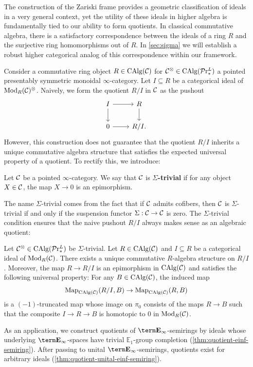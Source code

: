 \documentclass[10pt,a4paper,oneside]{article}
\begin{document}
The construction of the Zariski frame provides a geometric classification of ideals in a very general context, yet the utility of these ideals in higher algebra is fundamentally tied to our ability to form quotients. In classical commutative algebra, there is a satisfactory correspondence between the ideals of a ring $R$ and the surjective ring homomorphisms out of $R$. In \cref{sec:sigma} we will establish a robust higher categorical analog of this correspondence within our framework.

Consider a commutative ring object $R \in \operatorname{CAlg}(\mathcal{C})$ for $\mathcal{C}^\otimes\in\operatorname{CAlg}(\mathcal{P}\mathrm{r}^L_*)$ a pointed presentably symmetric monoidal $\infty$-category. Let $I\subseteq R$ be a categorical ideal of $\operatorname{Mod}_{R}(\mathcal{C})^\otimes$. Naively, we form the quotient $R/I$ in $\mathcal{C}$ as the pushout
\[
\begin{tikzcd}
I \arrow[d] \arrow[r] & R \arrow[d] \\
0 \arrow[r]           & R/I.
\end{tikzcd}
\]
However, this construction does not guarantee that the quotient $R/I$ inherits a unique commutative algebra structure that satisfies the expected universal property of a quotient. To rectify this, we introduce:
\begin{de}
Let $\mathcal{C}$ be a pointed $\infty$-category. We say that $\mathcal{C}$ is \textbf{$\Sigma$-trivial} if for any object $X\in\mathcal{C}$, the map $X\to0$ is an epimorphism.
\end{de}
The name $\Sigma$-trivial comes from the fact that if $\mathcal{C}$ admits cofibers, then $\mathcal{C}$ is $\Sigma$-trivial if and only if the suspension functor $\Sigma:\mathcal{C}\to \mathcal{C}$ is zero. The $\Sigma$-trivial condition ensures that the naive pushout $R/I$ always makes sense as an algebraic quotient:
\begin{thm}\label{thm:intro-quotidl}
Let $\mathcal{C}^\otimes\in\operatorname{CAlg}(\mathcal{P}\mathrm{r}^L_*)$ be $\Sigma$-trivial. Let $R\in\operatorname{CAlg}(\mathcal{C})$ and $I\subseteq R$ be a categorical ideal of $\operatorname{Mod}_{R}(\mathcal{C})$. There exists a unique commutative $R$-algebra structure on $R/I$. Moreover, the map $R\to R/I$ is an epimorphism in $\operatorname{CAlg}(\mathcal{C})$ and satisfies the following universal property: For any $B\in \operatorname{CAlg}(\mathcal{C})$, the induced map $$\operatorname{Map}_{\operatorname{CAlg}(\mathcal{C})}(R/I,B)\to \operatorname{Map}_{\operatorname{CAlg}(\mathcal{C})}(R,B)$$ is a $(-1)$-truncated map whose image on $\pi_0$ consists of the maps $R\to B$ such that the composite $I\to R\to B$ is homotopic to $0$ in $\operatorname{Mod}_R(\mathcal{C})$.
\end{thm}
As an application, we construct quotients of $\einf$-semirings by ideals whose underlying $\einf$-spaces have trivial $\mathbb{E}_1$-group completion (\cref{thm:quotient-einf-semiring}). After passing to unital $\einf$-semirings, quotients exist for arbitrary ideals (\cref{thm:quotient-unital-einf-semiring}).
\end{document}
